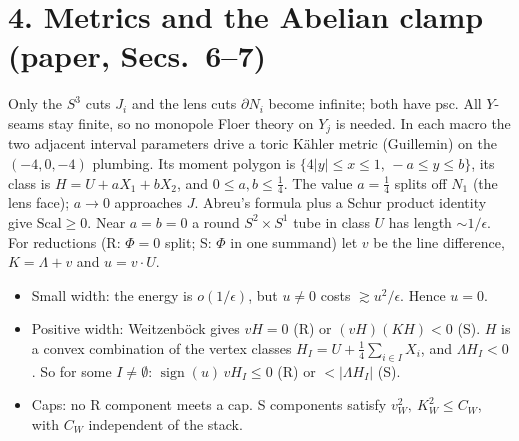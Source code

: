 \documentclass[10pt]{amsart}
\begin{document}
\section*{4. Metrics and the Abelian clamp (paper, Secs.~6--7)}
Only the $S^3$ cuts $J_i$ and the lens cuts $\partial N_i$ become infinite;
both have psc. All $Y$-seams stay finite, so no monopole Floer theory on
$Y_j$ is needed. In each macro the two adjacent interval parameters drive
a toric K\"ahler metric (Guillemin) on the $(-4,0,-4)$ plumbing. Its moment
polygon is $\{4|y|\le x\le1,\,-a\le y\le b\}$, its class is
$H=U+aX_1+bX_2$, and $0\le a,b\le\frac14$. The value $a=\frac14$ splits off
$N_1$ (the lens face); $a\to0$ approaches $J$. Abreu's formula plus a Schur
product identity give $\mathrm{Scal}\ge0$. Near $a=b=0$ a round
$S^2\times S^1$ tube in class $U$ has length $\sim1/\epsilon$.
For reductions (R: $\Phi=0$ split; S: $\Phi$ in one summand) let $v$ be the
line difference, $K=\Lambda+v$ and $u=v\cdot U$.
\begin{itemize}
\item Small width: the energy is $o(1/\epsilon)$, but $u\ne0$ costs
$\gtrsim u^2/\epsilon$. Hence $u=0$.
\item Positive width: Weitzenb\"ock gives $vH=0$ (R) or $(vH)(KH)<0$ (S).
$H$ is a convex combination of the vertex classes
$H_I=U+\frac14\sum_{i\in I}X_i$, and $\Lambda H_I<0$. So for some
$I\ne\emptyset$: $\operatorname{sign}(u)\,vH_I\le0$ (R) or
$<|\Lambda H_I|$ (S).
\item Caps: no R component meets a cap. S components satisfy
$v_W^2,\ K_W^2\le C_W$, with $C_W$ independent of the stack.
\end{itemize}
\end{document}
